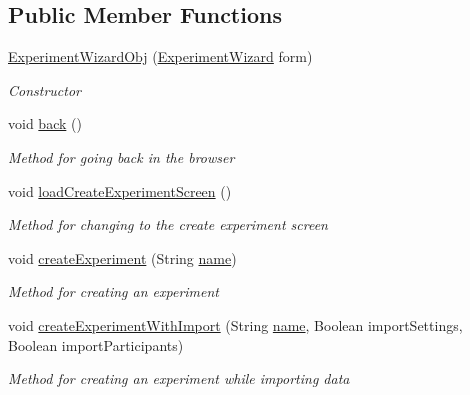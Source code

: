 \subsection*{Public Member Functions}
\begin{DoxyCompactItemize}
\item 
\hyperlink{class_web_analyzer_1_1_u_i_1_1_interaction_objects_1_1_experiment_wizard_obj_a556f5d452c9c8f983949604ecdd9e9e5}{Experiment\+Wizard\+Obj} (\hyperlink{class_web_analyzer_1_1_u_i_1_1_experiment_wizard}{Experiment\+Wizard} form)
\begin{DoxyCompactList}\small\item\em Constructor \end{DoxyCompactList}\item 
void \hyperlink{class_web_analyzer_1_1_u_i_1_1_interaction_objects_1_1_experiment_wizard_obj_a5df5c95c1b33e86c7b095a4af6861994}{back} ()
\begin{DoxyCompactList}\small\item\em Method for going back in the browser \end{DoxyCompactList}\item 
void \hyperlink{class_web_analyzer_1_1_u_i_1_1_interaction_objects_1_1_experiment_wizard_obj_ab31f1a51792e84018e1dcce87903551e}{load\+Create\+Experiment\+Screen} ()
\begin{DoxyCompactList}\small\item\em Method for changing to the create experiment screen \end{DoxyCompactList}\item 
void \hyperlink{class_web_analyzer_1_1_u_i_1_1_interaction_objects_1_1_experiment_wizard_obj_ade6772af7c7187e6296a727f11108581}{create\+Experiment} (String \hyperlink{_u_i_2_h_t_m_l_resources_2js_2src_2create__experiment_8js_adac2bcb4f01b574cbc63fe8ee2c56bf0}{name})
\begin{DoxyCompactList}\small\item\em Method for creating an experiment \end{DoxyCompactList}\item 
void \hyperlink{class_web_analyzer_1_1_u_i_1_1_interaction_objects_1_1_experiment_wizard_obj_a1e559426b9c210c4bc189c087869e466}{create\+Experiment\+With\+Import} (String \hyperlink{_u_i_2_h_t_m_l_resources_2js_2src_2create__experiment_8js_adac2bcb4f01b574cbc63fe8ee2c56bf0}{name}, Boolean import\+Settings, Boolean import\+Participants)
\begin{DoxyCompactList}\small\item\em Method for creating an experiment while importing data \end{DoxyCompactList}\item 

\end{DoxyCompactItemize}
